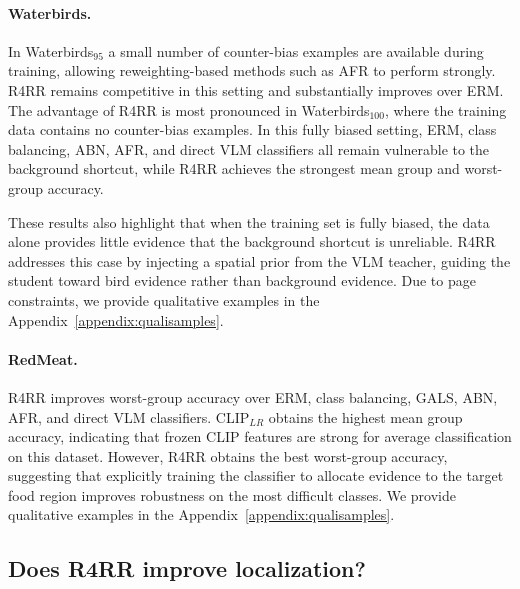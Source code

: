 \paragraph{Waterbirds.} In Waterbirds$_{95}$ a small number of counter-bias examples are available during training, allowing reweighting-based methods such as AFR to perform strongly. R4RR remains competitive in this setting and substantially improves over ERM. The advantage of R4RR is most pronounced in Waterbirds$_{100}$, where the training data contains no counter-bias examples. In this fully biased setting, ERM, class balancing, ABN, AFR, and direct VLM classifiers all remain vulnerable to the background shortcut, while R4RR achieves the strongest mean group and worst-group accuracy.

These results also highlight that when the training set is fully biased, the data alone provides little evidence that the background shortcut is unreliable. R4RR addresses this case by injecting a spatial prior from the VLM teacher, guiding the student toward bird evidence rather than background evidence. Due to page constraints, we provide qualitative examples in the Appendix~\ref{appendix:qualisamples}.

\paragraph{RedMeat.} R4RR improves worst-group accuracy over ERM, class balancing, GALS, ABN, AFR, and direct VLM classifiers. CLIP$_{LR}$ obtains the highest mean group accuracy, indicating that frozen CLIP features are strong for average classification on this dataset. However, R4RR obtains the best worst-group accuracy, suggesting that explicitly training the classifier to allocate evidence to the target food region improves robustness on the most difficult classes. We provide qualitative examples in the Appendix~\ref{appendix:qualisamples}.


\subsection{Does R4RR improve localization?}\label{sec:pointing}

